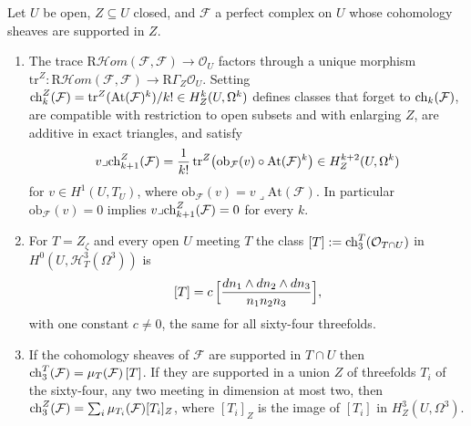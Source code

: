 \begin{lemma}\label{lem:chsupport}
Let $U$ be open, $Z\subseteq U$ closed, and $\mathcal{F}$ a perfect complex on $U$ whose cohomology sheaves are supported in $Z$.
\begin{enumerate}
\item[(i)] The trace $\mathrm{R}\mathcal{H}om(\mathcal{F},\mathcal{F})\to\mathcal{O}_{U}$ factors through a unique morphism $\mathrm{tr}^{Z}\colon\mathrm{R}\mathcal{H}om(\mathcal{F},\mathcal{F})\to\mathrm{R}\Gamma_{Z}\mathcal{O}_{U}$. Setting $\mathrm{ch}^{Z}_{k}(\mathcal{F})=\mathrm{tr}^{Z}(\mathrm{At}(\mathcal{F})^{k})/k!\in H^{k}_{Z}(U,\Omega^{k})$ defines classes that forget to $\mathrm{ch}_{k}(\mathcal{F})$, are compatible with restriction to open subsets and with enlarging $Z$, are additive in exact triangles, and satisfy
\[
v\lrcorner\mathrm{ch}^{Z}_{k+1}(\mathcal{F})=\frac{1}{k!}\,\mathrm{tr}^{Z}\bigl(\mathrm{ob}_{\mathcal{F}}(v)\circ\mathrm{At}(\mathcal{F})^{k}\bigr)\in H^{k+2}_{Z}(U,\Omega^{k})
\]
for $v\in H^{1}(U,T_{U})$, where $\mathrm{ob}_{\mathcal{F}}(v)=v\lrcorner\mathrm{At}(\mathcal{F})$. In particular $\mathrm{ob}_{\mathcal{F}}(v)=0$ implies $v\lrcorner\mathrm{ch}^{Z}_{k+1}(\mathcal{F})=0$ for every $k$.
\item[(ii)] For $T=Z_{\zeta}$ and every open $U$ meeting $T$ the class $[T]:=\mathrm{ch}^{T}_{3}(\mathcal{O}_{T\cap U})$ in $H^{0}(U,\mathcal{H}^{3}_{T}(\Omega^{3}))$ is
\[
[T]=c\,\Bigl[\frac{dn_{1}\wedge dn_{2}\wedge dn_{3}}{n_{1}n_{2}n_{3}}\Bigr],
\]
with one constant $c\ne0$, the same for all sixty-four threefolds.
\item[(iii)] If the cohomology sheaves of $\mathcal{F}$ are supported in $T\cap U$ then $\mathrm{ch}^{T}_{3}(\mathcal{F})=\mu_{T}(\mathcal{F})\,[T]$. If they are supported in a union $Z$ of threefolds $T_{i}$ of the sixty-four, any two meeting in dimension at most two, then $\mathrm{ch}^{Z}_{3}(\mathcal{F})=\sum_{i}\mu_{T_{i}}(\mathcal{F})[T_{i}]_{Z}$, where $[T_{i}]_{Z}$ is the image of $[T_{i}]$ in $H^{3}_{Z}(U,\Omega^{3})$.
\end{enumerate}
\end{lemma}

